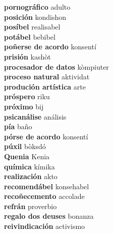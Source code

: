 \textbf{ pornográfico  } adulto \\
\textbf{ posición  } kondishon \\
\textbf{ posíbel  } realisabel \\
\textbf{ potábel  } bebibel \\
\textbf{ poñerse de acordo  } konsentí \\
\textbf{ prisión  } kashòt \\
\textbf{ procesador de datos  } kòmpiuter \\
\textbf{ proceso natural  } aktividat \\
\textbf{ produción artística  } arte \\
\textbf{ próspero  } riku \\
\textbf{ próximo  } bij \\
\textbf{ psicanálise  } análisis \\
\textbf{ pía  } baño \\
\textbf{ pórse de acordo  } konsentí \\
\textbf{ púxil  } bòksdó \\
\textbf{ Quenia  } Kenia \\
\textbf{ química  } kímika \\
\textbf{ realización  } akto \\
\textbf{ recomendábel  } konsehabel \\
\textbf{ recoñecemento  } accolade \\
\textbf{ refrán  } proverbio \\
\textbf{ regalo dos deuses  } bonanza \\
\textbf{ reivindicación  } activismo \\

